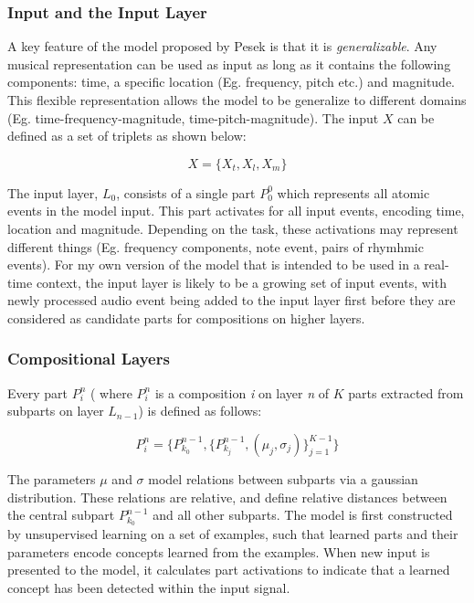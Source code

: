 \documentclass[../main.tex]{subfiles}
\begin{document}
\subsubsection{Input and the Input Layer}
A key feature of the model proposed by Pesek is that it is \textit{generalizable}. Any musical representation can be used as input as long as it contains the following components: time, a specific location (Eg. frequency, pitch etc.) and magnitude. This flexible representation allows the model to be generalize to different domains (Eg. time-frequency-magnitude, time-pitch-magnitude). The input $X$ can be defined as a set of triplets as shown below:

\[ \label{eq:1.1} X = \{X_t, X_l, X_m\} \tag{1.1}\]

\vspace{0.5cm}
The input layer, $L_0$, consists of a single part $P^0_0$ which represents all atomic events in the model input. This part activates for all input events, encoding time, location and magnitude. Depending on the task, these activations may represent different things (Eg. frequency components, note event, pairs of rhymhmic events). For my own version of the model that is intended to be used in a real-time context, the input layer is likely to be a growing set of input events, with newly processed audio event being added to the input layer first before they are considered as candidate parts for compositions on higher layers.


\subsubsection{Compositional Layers}
Every part $P^n_i$ ( where $P^n_i$ is a composition \textit{i} on layer \textit{n} of $K$ parts extracted from subparts on layer $L_{n-1}$) is defined as follows:

{\large
\begin{equation} \label{eq:1.2}
P^n_i = \{P^{n-1}_{k_0}, \{P^{n-1}_{k_j},(\mu_j,\sigma_j)\}^{K-1}_{j=1}\}
\tag{1.2}
\end{equation}
}

\vspace{0.5cm}
The parameters $\mu$ and $\sigma$ model relations between subparts via a gaussian distribution. These relations are relative, and define relative distances between the central subpart $P^{n-1}_{k_0}$ and all other subparts. The model is first constructed by unsupervised learning on a set of examples, such that learned parts and their parameters encode concepts learned from the examples. When new input is presented to the model, it calculates part activations to indicate that a learned concept has been detected within the input signal. 
\end{document}
